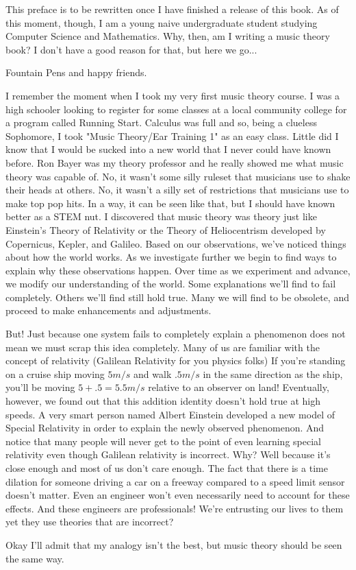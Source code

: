 \documentclass[../OpenAppliedMusicTheory.tex]{subfiles}
\begin{document}
    


    This preface is to be rewritten once I have finished a release of this book. As of this moment, though, I am a young naive undergraduate student studying Computer Science and Mathematics. Why, then, am I writing a music theory book? I don't have a good reason for that, but here we go...

    Fountain Pens and happy friends. 

    I remember the moment when I took my very first music theory course. I was a high schooler looking to register for some classes at a local community college for a program called Running Start. Calculus was full and so, being a clueless Sophomore, I took "Music Theory/Ear Training 1" as an easy class. Little did I know that I would be sucked into a new world that I never could have known before. Ron Bayer was my theory professor and he really showed me what music theory was capable of. No, it wasn't some silly ruleset that musicians use to shake their heads at others. No, it wasn't a silly set of restrictions that musicians use to make top pop hits. In a way, it can be seen like that, but I should have known better as a STEM nut. I discovered that music theory was theory just like Einstein's Theory of Relativity or the Theory of Heliocentrism developed by Copernicus, Kepler, and Galileo. Based on our observations, we've noticed things about how the world works. As we investigate further we begin to find ways to explain why these observations happen. Over time as we experiment and advance, we modify our understanding of the world. Some explanations we'll find to fail completely. Others we'll find still hold true. Many we will find to be obsolete, and proceed to make enhancements and adjustments. 

    But! Just because one system fails to completely explain a phenomenon does not mean we must scrap this idea completely. Many of us are familiar with the concept of relativity (Galilean Relativity for you physics folks) If you're standing on a cruise ship moving $5m/s$ and walk $.5m/s$ in the same direction as the ship, you'll be moving $5+.5=5.5m/s$ relative to an observer on land! Eventually, however, we found out that this addition identity doesn't hold true at high speeds. A very smart person named Albert Einstein developed a new model of Special Relativity in order to explain the newly observed phenomenon. And notice that many people will never get to the point of even learning special relativity even though Galilean relativity is incorrect. Why? Well because it's close enough and most of us don't care enough. The fact that there is a time dilation for someone driving a car on a freeway compared to a speed limit sensor doesn't matter. Even an engineer won't even necessarily need to account for these effects. And these engineers are professionals! We're entrusting our lives to them yet they use theories that are incorrect?

    Okay I'll admit that my analogy isn't the best, but music theory should be seen the same way.
\end{document}

